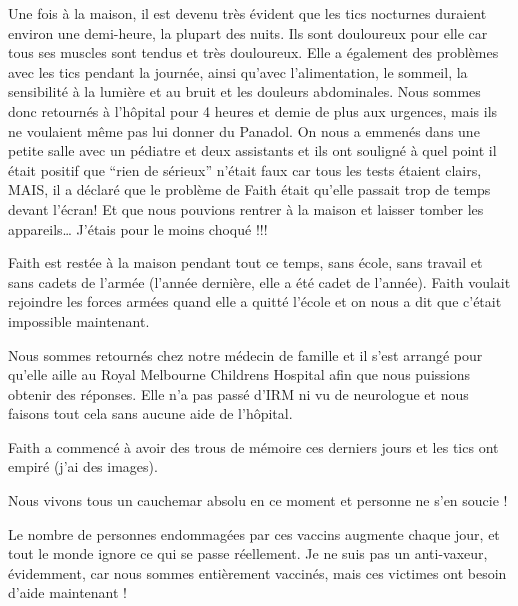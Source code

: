 Une fois à la maison, il est devenu très évident que les tics nocturnes duraient
environ une demi-heure, la plupart des nuits. Ils sont douloureux pour elle car
tous ses muscles sont tendus et très douloureux. Elle a également des problèmes
avec les tics pendant la journée, ainsi qu'avec l'alimentation, le sommeil, la
sensibilité à la lumière et au bruit et les douleurs abdominales. Nous sommes
donc retournés à l'hôpital pour 4 heures et demie de plus aux urgences, mais ils
ne voulaient même pas lui donner du Panadol. On nous a emmenés dans une petite
salle avec un pédiatre et deux assistants et ils ont souligné à quel point il
était positif que “rien de sérieux” n'était faux car tous les tests étaient
clairs, MAIS, il a déclaré que le problème de Faith était qu'elle passait trop
de temps devant l'écran! Et que nous pouvions rentrer à la maison et laisser
tomber les appareils… J'étais pour le moins choqué !!!

Faith est restée à la maison pendant tout ce temps, sans école, sans travail et
sans cadets de l'armée (l'année dernière, elle a été cadet de l'année). Faith
voulait rejoindre les forces armées quand elle a quitté l'école et on nous a dit
que c'était impossible maintenant.

Nous sommes retournés chez notre médecin de famille et il s'est arrangé pour
qu'elle aille au Royal Melbourne Childrens Hospital afin que nous puissions
obtenir des réponses. Elle n'a pas passé d'IRM ni vu de neurologue et nous
faisons tout cela sans aucune aide de l'hôpital.

Faith a commencé à avoir des trous de mémoire ces derniers jours et les tics ont
empiré (j'ai des images).

Nous vivons tous un cauchemar absolu en ce moment et personne ne s'en soucie !

Le nombre de personnes endommagées par ces vaccins augmente chaque jour, et tout
le monde ignore ce qui se passe réellement. Je ne suis pas un anti-vaxeur,
évidemment, car nous sommes entièrement vaccinés, mais ces victimes ont besoin
d'aide maintenant !
